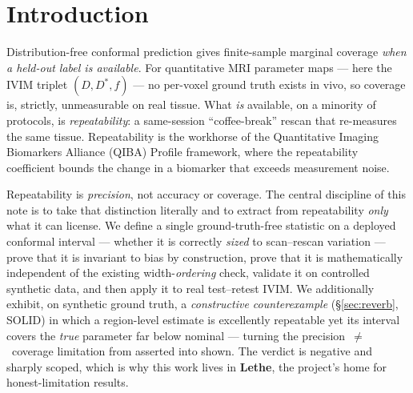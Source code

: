 \documentclass[11pt]{article}
\newcommand{\Dstar}{D^{*}}
\begin{document}
\section{Introduction}\label{sec:intro}
Distribution-free conformal prediction gives finite-sample marginal coverage \emph{when a
held-out label is available}. For quantitative MRI parameter maps --- here the IVIM triplet
$(D,\Dstar,f)$ --- no per-voxel ground truth exists in vivo, so coverage is, strictly,
unmeasurable on real tissue. What \emph{is} available, on a minority of protocols, is
\emph{repeatability}: a same-session ``coffee-break'' rescan that re-measures the same
tissue. Repeatability is the workhorse of the Quantitative Imaging Biomarkers Alliance
(QIBA) Profile framework, where the repeatability coefficient bounds the change in a
biomarker that exceeds measurement noise.

Repeatability is \emph{precision}, not accuracy or coverage. The central discipline of this
note is to take that distinction literally and to extract from repeatability \emph{only}
what it can license. We define a single ground-truth-free statistic on a deployed conformal
interval --- whether it is correctly \emph{sized} to scan--rescan variation --- prove that
it is invariant to bias by construction, prove that it is mathematically independent of the
existing width-\emph{ordering} check, validate it on controlled synthetic data, and then
apply it to real test--retest IVIM. We additionally exhibit, on synthetic ground truth, a
\emph{constructive counterexample} (\S\ref{sec:reverb}, SOLID) in which a region-level estimate is
excellently repeatable yet its interval covers the \emph{true} parameter far below nominal ---
turning the precision~$\ne$~coverage limitation from asserted into shown. The verdict is negative
and sharply scoped, which is why this work lives in \textbf{Lethe}, the project's home for
honest-limitation results.
\end{document}
